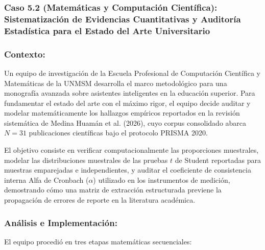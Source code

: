 \subsubsection{Caso 5.2 (Matemáticas y Computación Científica): Sistematización de Evidencias Cuantitativas y Auditoría Estadística para el Estado del Arte Universitario}

\subsubsection*{Contexto:}
Un equipo de investigación de la Escuela Profesional de Computación Científica y Matemáticas de la UNMSM desarrolla el marco metodológico para una monografía avanzada sobre asistentes inteligentes en la educación superior. Para fundamentar el estado del arte con el máximo rigor, el equipo decide auditar y modelar matemáticamente los hallazgos empíricos reportados en la revisión sistemática de Medina Huamán et al. (2026), cuyo corpus consolidado abarca $N = 31$ publicaciones científicas bajo el protocolo PRISMA 2020.

El objetivo consiste en verificar computacionalmente las proporciones muestrales, modelar las distribuciones muestrales de las pruebas $t$ de Student reportadas para muestras emparejadas e independientes, y auditar el coeficiente de consistencia interna Alfa de Cronbach ($\alpha$) utilizado en los instrumentos de medición, demostrando cómo una matriz de extracción estructurada previene la propagación de errores de reporte en la literatura académica.

\subsubsection*{Análisis e Implementación:}
El equipo procedió en tres etapas matemáticas secuenciales:

